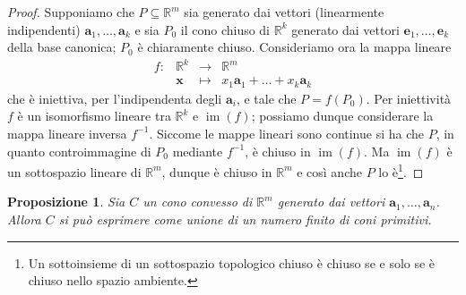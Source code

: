 \documentclass[italian, 12pt, reqno]{article}
\theoremstyle{myteo}
\newtheorem{proposition}[theorem]{Proposizione}
\numberwithin{equation}{section}
\DeclareMathOperator{\im}{im}
\begin{document}
\begin{proof}
  Supponiamo che \(P\subseteq \mathbb{R}^m\) sia generato dai vettori (linearmente indipendenti) \(\mathbf{a}_1,\ldots,\mathbf{a}_k\) e sia \(P_0\) il cono chiuso di \(\mathbb{R}^k\) generato dai vettori \(\mathbf{e}_1,\ldots,\mathbf{e}_k\) della base canonica;  \(P_0\) è chiaramente chiuso.
  Consideriamo ora la mappa lineare
  \begin{equation*}
    \begin{array}{crcl}
      f\colon & \mathbb{R}^k & \to & \mathbb{R}^m\\
              & \mathbf{x} & \mapsto & x_1 \mathbf{a}_1 + \ldots + x_k \mathbf{a}_k
    \end{array}
  \end{equation*}
  che è iniettiva, per l'indipendenta degli \(\mathbf{a}_i\), e tale che \(P = f(P_0)\).
  Per iniettività \(f\) è un isomorfismo lineare tra \(\mathbb{R}^k\) e \(\im(f)\); possiamo dunque considerare la mappa lineare inversa \(f^{-1}\).
  Siccome le mappe lineari sono continue si ha che \(P\), in quanto controimmagine di \(P_0\) mediante \(f^{-1}\), è chiuso in \(\im(f)\).
  Ma \(\im(f)\) è un sottospazio lineare di \(\mathbb{R}^m\), dunque è chiuso in \(\mathbb{R}^m\) e così anche \(P\) lo è\footnote{Un sottoinsieme di un sottospazio topologico chiuso è chiuso se e solo se è chiuso nello spazio ambiente.}.
\end{proof}

\begin{proposition}
  \label{prop:unione_di_coni}
  Sia \(C\) un cono convesso di \(\mathbb{R}^m\) generato dai vettori \(\mathbf{a}_1,\ldots,\mathbf{a}_n\).
  Allora \(C\) si può esprimere come unione di un numero finito di coni primitivi.
\end{proposition}
\end{document}
